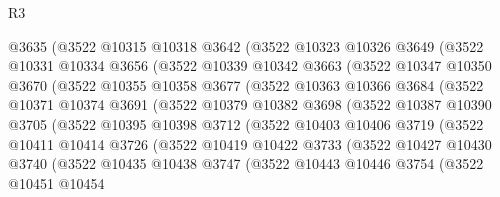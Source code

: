 \begin{lexlean}{R3}
\begin{coremodule}
            @3635
            (@3522
              @10315
              @10318
              @3642
              (@3522
                @10323
                @10326
                @3649
                (@3522
                  @10331
                  @10334
                  @3656
                  (@3522
                    @10339
                    @10342
                    @3663
                    (@3522
                      @10347
                      @10350
                      @3670
                      (@3522
                        @10355
                        @10358
                        @3677
                        (@3522
                          @10363
                          @10366
                          @3684
                          (@3522
                            @10371
                            @10374
                            @3691
                            (@3522
                              @10379
                              @10382
                              @3698
                              (@3522
                                @10387
                                @10390
                                @3705
                                (@3522
                                  @10395
                                  @10398
                                  @3712
                                  (@3522
                                    @10403
                                    @10406
                                    @3719
                                    (@3522
                                      @10411
                                      @10414
                                      @3726
                                      (@3522
                                        @10419
                                        @10422
                                        @3733
                                        (@3522
                                          @10427
                                          @10430
                                          @3740
                                          (@3522
                                            @10435
                                            @10438
                                            @3747
                                            (@3522
                                              @10443
                                              @10446
                                              @3754
                                              (@3522
                                                @10451
                                                @10454

\end{coremodule}
\end{lexlean}
